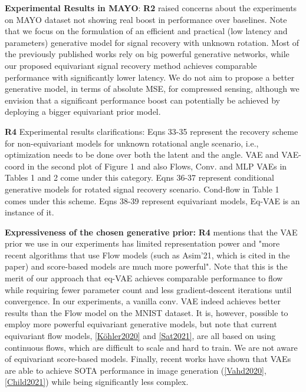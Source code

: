 \documentclass{article}
\begin{document}
\textbf{Experimental Results in MAYO}: \textbf{R2} raised concerns about the experiments on MAYO dataset not showing real boost in performance over baselines.
Note that we focus on the formulation of an efficient and practical (low latency and parameters) generative model for signal recovery with unknown rotation. Most of the previously published works rely on big powerful generative networks, while our proposed equivariant signal recovery method achieves comparable performance with significantly lower latency.  We do not aim to propose a better generative model, in terms of absolute MSE, for compressed sensing, although we envision that a significant performance boost can potentially be achieved by deploying a bigger equivariant prior model.

\textbf{R4} Experimental results clarifications: Eqns 33-35 represent the recovery scheme for non-equivariant models for unknown rotational angle scenario, i.e., optimization needs to be done over both the latent and the angle. VAE and VAE-coord in the second plot of Figure 1 and also Flows, Conv. and MLP VAEs in Tables 1 and 2 come under this category. Eqns 36-37 represent conditional generative models for rotated signal recovery scenario. Cond-flow in Table 1 comes under this scheme. Eqns 38-39 represent equivariant models, Eq-VAE is an instance of it.

\textbf{Expressiveness of the chosen generative prior: }\textbf{R4} mentions that the VAE prior we use in our experiments has limited representation power and "more recent algorithms that use Flow models (such as Asim'21, which is cited in the paper) and score-based models are much more powerful". Note that this is the merit of our approach that eq-VAE achieves comparable performance to flow while requiring fewer parameter count and less gradient-descent iterations until convergence. In our experiments, a vanilla conv. VAE indeed achieves better results than the Flow model on the MNIST dataset. It is, however, possible to employ more powerful equivariant generative models, but note that current equivariant flow models, \href{https://arxiv.org/abs/2006.02425}{[Köhler2020]} and \href{https://arxiv.org/abs/2105.09016}{[Sat2021]}, are all based on using continuous flows, which are difficult to scale and hard to train. We are not aware of equivariant score-based models. Finally, recent works have shown that VAEs are able to achieve SOTA performance in image generation (\href{https://arxiv.org/abs/2007.03898}{[Vahd2020]}, \href{https://arxiv.org/abs/2011.10650}{[Child2021]}) while being significantly less complex.
\end{document}
